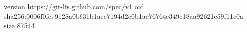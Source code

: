 version https://git-lfs.github.com/spec/v1
oid sha256:0006f0fe79128a0b931b1aee7194d2c0b1ae76764e349c18aa92621e59f11c0a
size 87544
